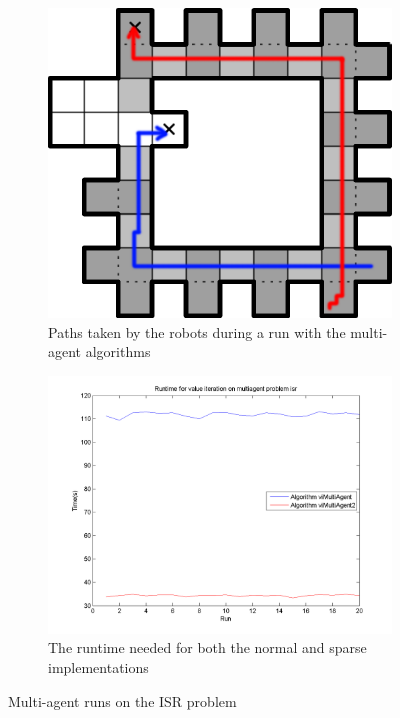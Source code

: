 \documentclass[10pt,a4paper]{article}
\begin{document}
\begin{figure}
        \centering
        \begin{subfigure}{0.4\textwidth}
                \includegraphics[width=\textwidth]{todo/isr/path-multi.png}
                \caption{Paths taken by the robots during a run with the multi-agent algorithms}
                \label{fig:multi_isr_part1}
                \hspace{10pt}
        \end{subfigure}
        \quad
        \begin{subfigure}{0.48\textwidth}
        		\includegraphics[width=\textwidth]{todo/isr/timings_vi.png}
                \caption{The runtime needed for both the normal and sparse implementations}
                \label{fig:multi_isr_part2}
                \hspace{-10pt}
        \end{subfigure}
        \caption{Multi-agent runs on the ISR problem}
        \label{fig:multi_isr}
\end{figure}
\end{document}
